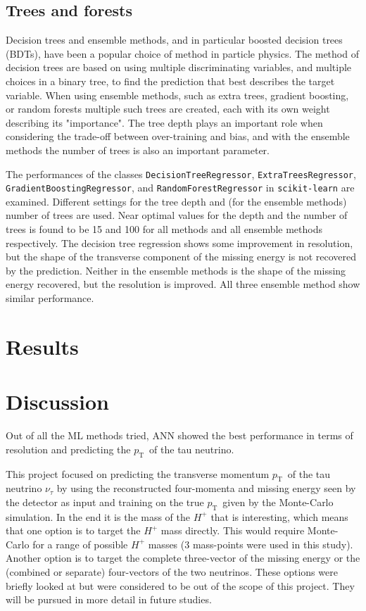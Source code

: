 \documentclass{scrartcl}
\newcommand{\pt}{\ensuremath{p_\text{T}}~}
\begin{document}
\subsection{Trees and forests}

Decision trees and ensemble methods, and in particular boosted decision trees (BDTs), have been a popular choice of method in particle physics. The method of decision trees are based on using multiple discriminating variables, and multiple choices in a binary tree, to find the prediction that best describes the target variable. When using ensemble methods, such as extra trees, gradient boosting, or random forests multiple such trees are created, each with its own weight describing its "importance". The tree depth plays an important role when considering the trade-off between over-training and bias, and with the ensemble methods the number of trees is also an important parameter.

The performances of the classes \texttt{DecisionTreeRegressor}, \texttt{ExtraTreesRegressor}, \texttt{GradientBoostingRegressor}, and \texttt{RandomForestRegressor} in \texttt{scikit-learn} are examined. Different settings for the tree depth and (for the ensemble methods) number of trees are used. Near optimal values for the depth and the number of trees is found to be 15 and 100 for all methods and all ensemble methods respectively. The decision tree regression shows some improvement in resolution, but the shape of the transverse component of the missing energy is not recovered by the prediction. Neither in the ensemble methods is the shape of the missing energy recovered, but the resolution is improved. All three ensemble method show similar performance.

\section{Results}
\label{sec:results}


\section{Discussion}

Out of all the \gls{ML} methods tried, \gls{ANN} showed the best performance in terms of resolution and predicting the \pt of the tau neutrino.

This project focused on predicting the transverse momentum \pt of the tau neutrino $\nu_\tau$ by using the reconstructed four-momenta and missing energy seen by the detector as input and training on the true \pt given by the Monte-Carlo simulation. In the end it is the mass of the $H^+$ that is interesting, which means that one option is to target the $H^+$ mass directly. This would require Monte-Carlo for a range of possible $H^+$ masses (3 mass-points were used in this study). Another option is to target the complete three-vector of the missing energy or the (combined or separate) four-vectors of the two neutrinos. These options were briefly looked at but were considered to be out of the scope of this project. They will be pursued in more detail in future studies.
\end{document}

